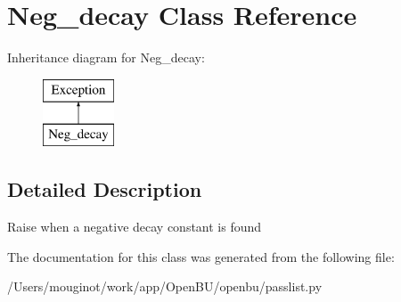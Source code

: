 \hypertarget{classopenbu_1_1passlist_1_1_neg__decay}{}\section{Neg\+\_\+decay Class Reference}
\label{classopenbu_1_1passlist_1_1_neg__decay}
Inheritance diagram for Neg\+\_\+decay\+:\begin{figure}[H]
\begin{center}
\leavevmode
\includegraphics[height=2.000000cm]{classopenbu_1_1passlist_1_1_neg__decay}
\end{center}
\end{figure}


\subsection{Detailed Description}
\begin{DoxyVerb}Raise when a negative decay constant is found\end{DoxyVerb}
 

The documentation for this class was generated from the following file\+:\begin{DoxyCompactItemize}
\item 
/\+Users/mouginot/work/app/\+Open\+B\+U/openbu/passlist.\+py\end{DoxyCompactItemize}
